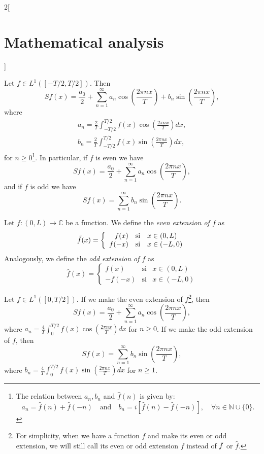 \documentclass[class=article,crop=false]{standalone}
\begin{document}
\begin{multicols}{2}[\section{Mathematical analysis}]
\begin{definition}
\end{definition}
\begin{prop}
Let $f\in L^1([-T/2,T/2])$. Then $$Sf(x)=\frac{a_0}{2}+\sum_{n=1}^\infty a_n\cos\left(\frac{2\pi nx}{T}\right)+b_n\sin\left(\frac{2\pi nx}{T}\right),$$ where \begin{gather*}
    a_n=\frac{2}{T}\int_{-T/2}^{T/2}f(x)\cos\left(\frac{2\pi nx}{T}\right)dx,\\ b_n=\frac{2}{T}\int_{-T/2}^{T/2}f(x)\sin\left(\frac{2\pi nx}{T}\right)dx,
\end{gather*} for $n\geq 0$\footnote{The relation between $a_n,b_n$ and $\widehat{f}(n)$ is given by: $$a_n=\widehat{f}(n)+\widehat{f}(-n)\quad\text{and}\quad b_n=i\left[\widehat{f}(n)-\widehat{f}(-n)\right],\quad\forall n\in\mathbb{N}\cup\{0\}.$$}. In particular, if $f$ is even we have $$Sf(x)=\frac{a_0}{2}+\sum_{n=1}^\infty a_n\cos\left(\frac{2\pi nx}{T}\right),$$ and if $f$ is odd we have $$Sf(x)=\sum_{n=1}^\infty b_n\sin\left(\frac{2\pi nx}{T}\right).$$ 
\end{prop}
\begin{definition}
Let $f:(0,L)\rightarrow\mathbb{C}$ be a function. We define the \textit{even extension of $f$} as $$\Tilde{f}(x)=\left\{
    \begin{array}{rcl}
    f(x) & \text{si} & x\in(0,L) \\
    f(-x) & \text{si} & x\in(-L,0)
    \end{array}\right.$$ Analogously, we define the \textit{odd extension of $f$} as $$\hat{f}(x)=\left\{
    \begin{array}{rcl}
    f(x) & \text{si} & x\in(0,L) \\
    -f(-x) & \text{si} & x\in(-L,0)
    \end{array}\right.$$
\end{definition}
\begin{prop}
Let $f\in L^1([0,T/2])$. If we make the even extension of $f$\footnote{For simplicity, when we have a function $f$ and make its even or odd extension, we will still call its even or odd extension $f$ instead of $\Tilde{f}$ or $\hat{f}$.}, then $$Sf(x)=\frac{a_0}{2}+\sum_{n=1}^\infty a_n\cos\left(\frac{2\pi nx}{T}\right),$$ where $\displaystyle a_n=\frac{4}{T}\int_0^{T/2}f(x)\cos\left(\frac{2\pi nx}{T}\right)dx$ for $n\geq 0$. If we make the odd extension of $f$, then $$Sf(x)=\sum_{n=1}^\infty b_n\sin\left(\frac{2\pi nx}{T}\right),$$ where $\displaystyle b_n=\frac{4}{T}\int_0^{T/2}f(x)\sin\left(\frac{2\pi nx}{T}\right)dx$ for $n\geq 1$.
\end{prop}

\end{multicols}
\end{document}
